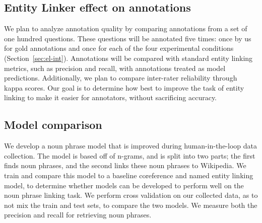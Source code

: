 \subsection{Entity Linker effect on annotations}
\label{sec:quality}

We plan to analyze annotation quality by comparing annotations from a set of one hundred questions.
These questions will be annotated five times: once by us for gold annotations and once for each of the four experimental conditions (Section~\ref{sec:el-int}).
Annotations will be compared with standard entity linking metrics, such as precision and recall, with annotations treated as model predictions.
Additionally, we plan to compare inter-rater reliability through kappa scores. 
Our goal is to determine how best to improve the task of entity linking to make it easier for annotators, without sacrificing accuracy. 

\subsection{Model comparison}
We develop a noun phrase model that is improved during human-in-the-loop data collection. 
The model is based off of n-grams, and is split into two parts; the first finds noun phrases, and the second links these noun phrases to Wikipedia. 
We train and compare this model to a baseline coreference and named entity linking model, to determine whether models can be developed to perform well on the noun phrase linking task. 
We perform cross validation on our collected data, as to not mix the train and test sets, to compare the two models. 
We measure both the precision and recall for retrieving noun phrases. 
 







